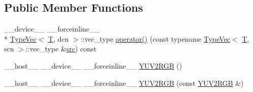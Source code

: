 \subsection*{Public Member Functions}
\begin{DoxyCompactItemize}
\item 
\-\_\-\-\_\-device\-\_\-\-\_\- \-\_\-\-\_\-forceinline\-\_\-\-\_\- \\*
\hyperlink{structcv_1_1gpu_1_1device_1_1TypeVec}{Type\-Vec}$<$ \hyperlink{calib3d_8hpp_a3efb9551a871ddd0463079a808916717}{T}, dcn $>$\-::vec\-\_\-type \hyperlink{structcv_1_1gpu_1_1device_1_1color__detail_1_1YUV2RGB_ad22a27196459350a5e89d9871b9b21a3}{operator()} (const typename \hyperlink{structcv_1_1gpu_1_1device_1_1TypeVec}{Type\-Vec}$<$ \hyperlink{calib3d_8hpp_a3efb9551a871ddd0463079a808916717}{T}, scn $>$\-::vec\-\_\-type \&\hyperlink{legacy_8hpp_a371cd109b74033bc4366f584edd3dacc}{src}) const 
\item 
\-\_\-\-\_\-host\-\_\-\-\_\- \-\_\-\-\_\-device\-\_\-\-\_\- \-\_\-\-\_\-forceinline\-\_\-\-\_\- \hyperlink{structcv_1_1gpu_1_1device_1_1color__detail_1_1YUV2RGB_af455b7412a9c80da00abeeba68257d69}{Y\-U\-V2\-R\-G\-B} ()
\item 
\-\_\-\-\_\-host\-\_\-\-\_\- \-\_\-\-\_\-device\-\_\-\-\_\- \-\_\-\-\_\-forceinline\-\_\-\-\_\- \hyperlink{structcv_1_1gpu_1_1device_1_1color__detail_1_1YUV2RGB_ae8aa6f9b221816b733fe5050c3c60600}{Y\-U\-V2\-R\-G\-B} (const \hyperlink{structcv_1_1gpu_1_1device_1_1color__detail_1_1YUV2RGB}{Y\-U\-V2\-R\-G\-B} \&)
\end{DoxyCompactItemize}


